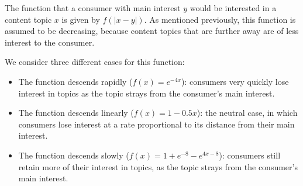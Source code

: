 \documentclass[11pt, letterpaper]{article}
\begin{document}
The function that a consumer with main interest \(y\) would be interested in a content topic \(x\) is given by \(f(|x-y|)\). As mentioned previously, this function is assumed to be decreasing, because content topics that are further away are of less interest to the consumer.

We consider three different cases for this function:
\begin{itemize}
    \item The function descends rapidly (\(f(x) = e^{-4x}\)): consumers very quickly lose interest in topics as the topic strays from the consumer's main interest.
    \item The function descends linearly (\(f(x) = 1 - 0.5x\)): the neutral case, in which consumers lose interest at a rate proportional to its distance from their main interest.
    \item The function descends slowly (\(f(x) = 1 + e^{-8} - e^{4 x - 8}\)): consumers still retain more of their interest in topics, as the topic strays from the consumer's main interest.
\end{itemize}
\end{document}
